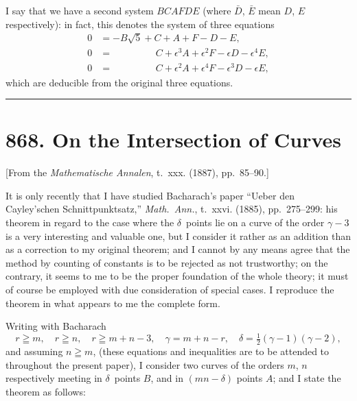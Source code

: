 \documentclass[11pt,a4paper]{book}
\begin{document}
I say that we have a second system $BCAFDE$ (where $\bar{D}$, $\bar{E}$ mean $D$, $E$ respectively): in fact, this denotes the system of three equations
\begin{align*}
0 &= -B\sqrt{5} + C + A + F - D - E, \\
0 &= \phantom{-B\sqrt{5} +}\, C + \epsilon^3 A + \epsilon^2 F - \epsilon D - \epsilon^4 E, \\
0 &= \phantom{-B\sqrt{5} +}\, C + \epsilon^2 A + \epsilon^4 F - \epsilon^3 D - \epsilon E,
\end{align*}
which are deducible from the original three equations.

\vspace{12pt}
\hrule
\vspace{12pt}

\section*{868. On the Intersection of Curves}

\begin{center}
[From the \textit{Mathematische Annalen}, t.~xxx. (1887), pp.~85--90.]
\end{center}

It is only recently that I have studied Bacharach's paper ``Ueber den Cayley'schen Schnittpunktsatz,'' \textit{Math.~Ann.}, t.~xxvi. (1885), pp.~275--299: his theorem in regard to the case where the $\delta$~points lie on a curve of the order $\gamma - 3$ is a very interesting and valuable one, but I consider it rather as an addition than as a correction to my original theorem; and I cannot by any means agree that the method by counting of constants is to be rejected as not trustworthy; on the contrary, it seems to me to be the proper foundation of the whole theory; it must of course be employed with due consideration of special cases. I reproduce the theorem in what appears to me the complete form.

Writing with Bacharach
\[r \geqq m, \quad r \geqq n, \quad r \geqq m + n - 3, \quad \gamma = m + n - r, \quad \delta = \tfrac{1}{2}(\gamma - 1)(\gamma - 2),\]
and assuming $n \geqq m$, (these equations and inequalities are to be attended to throughout the present paper), I consider two curves of the orders $m$, $n$ respectively meeting in $\delta$~points $B$, and in $(mn - \delta)$ points $A$; and I state the theorem as follows:
\end{document}
